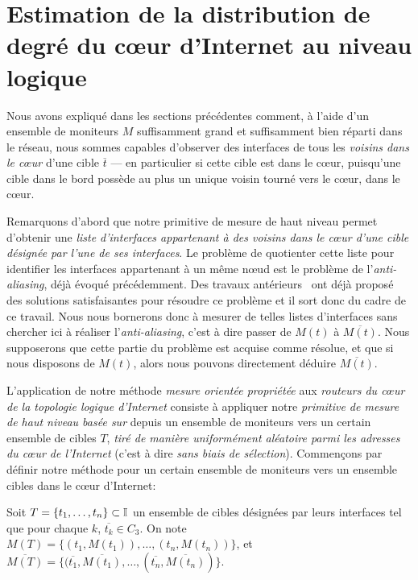 \section{Estimation de la distribution de degré du cœur d'Internet au niveau
logique}
\label{sec:traceroute-many-to-many}

Nous avons expliqué dans les sections précédentes comment, à l'aide d'un
ensemble de moniteurs $M$ suffisamment grand et suffisamment bien réparti dans
le réseau, nous sommes capables d'observer des interfaces de tous les {\em
voisins dans le cœur} d'une cible $\overline{t}$ --- en particulier si cette
cible est dans le cœur, puisqu'une cible dans le bord possède au plus un unique
voisin tourné vers le cœur, \afortiori dans le cœur.

Remarquons d'abord que notre primitive de mesure de haut niveau permet d'obtenir
une {\em liste d'interfaces appartenant à des voisins dans le cœur d'une cible
désignée par l'une de ses interfaces}. Le problème de quotienter cette liste
pour identifier les interfaces appartenant à un même n\oe{}ud est le problème de
l'{\em anti-aliasing}, déjà évoqué précédemment. Des travaux
antérieurs~\cite{GunesS09,alias-bias,keys2010internet} ont déjà proposé des
solutions satisfaisantes pour résoudre ce problème et il sort donc du cadre de
ce travail.
Nous nous bornerons donc à mesurer de telles listes d'interfaces sans chercher
ici à réaliser l'{\em anti-aliasing}, c'est à dire passer de $M(t)$ à
$\overline{M(t)}$. Nous supposerons que cette partie du problème est acquise
comme résolue, et que si nous disposons de $M(t)$, alors nous pouvons
directement déduire $\overline{M(t)}$.

L'application de notre méthode {\em mesure orientée propriétée} aux {\em
routeurs du cœur de la topologie logique d'Internet} consiste à appliquer notre
{\em primitive de mesure de haut niveau basée sur \traceroute} depuis un
ensemble de moniteurs vers un certain ensemble de cibles $T$, {\em tiré de
manière uniformément aléatoire parmi les adresses du cœur de l'Internet} (c'est
à dire {\em sans biais de sélection}).
Commençons par définir notre méthode pour un certain ensemble de moniteurs vers
un ensemble cibles dans le cœur d'Internet:

\begin{definition} Soit $T = \{t_1, \ldots, t_n\} \subset \mathbb{I}$ un ensemble de cibles
désignées par leurs interfaces tel que pour chaque $k$, $\overline{t_k} \in
C_3$.
On note $M(T) = \{(t_1, M(t_1)), \ldots, (t_n, M(t_n))\}$, et $\overline{M(T)} =
\{(\overline{t_1}, \overline{M(t_1)}, \ldots, (\overline{t_n},
\overline{M(t_n)})\}$. 
\end{definition}

